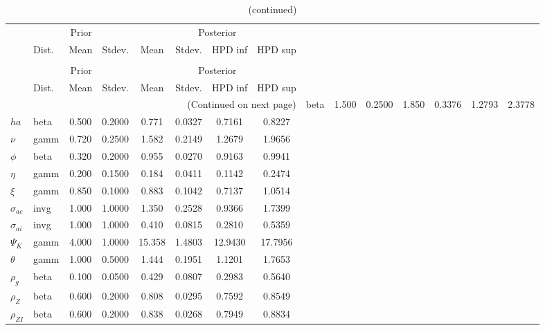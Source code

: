  
\begin{center}
\begin{longtable}{llcccccc} 
\caption{Results from Metropolis-Hastings (parameters)}
 \label{Table:MHPosterior:1}\\
\toprule 
  & \multicolumn{3}{c}{Prior}  &  \multicolumn{4}{c}{Posterior} \\
  \cmidrule(r{.75em}){2-4} \cmidrule(r{.75em}){5-8}
  & Dist. & Mean  & Stdev. & Mean & Stdev. & HPD inf & HPD sup\\
\midrule \endfirsthead 
\caption{(continued)}\\\toprule 
  & \multicolumn{3}{c}{Prior}  &  \multicolumn{4}{c}{Posterior} \\
  \cmidrule(r{.75em}){2-4} \cmidrule(r{.75em}){5-8}
  & Dist. & Mean  & Stdev. & Mean & Stdev. & HPD inf & HPD sup\\
\midrule \endhead 
\bottomrule \multicolumn{8}{r}{(Continued on next page)} \endfoot 
\bottomrule \endlastfoot 
${\sigma}$ & beta &   1.500 & 0.2500 &   1.850& 0.3376 &  1.2793 &  2.3778 \\ 
${ha}$ & beta &   0.500 & 0.2000 &   0.771& 0.0327 &  0.7161 &  0.8227 \\ 
$\nu$ & gamm &   0.720 & 0.2500 &   1.582& 0.2149 &  1.2679 &  1.9656 \\ 
${\phi}$ & beta &   0.320 & 0.2000 &   0.955& 0.0270 &  0.9163 &  0.9941 \\ 
${\eta}$ & gamm &   0.200 & 0.1500 &   0.184& 0.0411 &  0.1142 &  0.2474 \\ 
$\xi$ & gamm &   0.850 & 0.1000 &   0.883& 0.1042 &  0.7137 &  1.0514 \\ 
${\sigma_{ac}}$ & invg &   1.000 & 1.0000 &   1.350& 0.2528 &  0.9366 &  1.7399 \\ 
${\sigma_{ai}}$ & invg &   1.000 & 1.0000 &   0.410& 0.0815 &  0.2810 &  0.5359 \\ 
${\Psi_{K}}$ & gamm &   4.000 & 1.0000 &  15.358& 1.4803 & 12.9430 & 17.7956 \\ 
${\theta}$ & gamm &   1.000 & 0.5000 &   1.444& 0.1951 &  1.1201 &  1.7653 \\ 
${\rho_g}$ & beta &   0.100 & 0.0500 &   0.429& 0.0807 &  0.2983 &  0.5640 \\ 
${\rho_Z}$ & beta &   0.600 & 0.2000 &   0.808& 0.0295 &  0.7592 &  0.8549 \\ 
${\rho_{ZI}}$ & beta &   0.600 & 0.2000 &   0.838& 0.0268 &  0.7949 &  0.8834 \\ 

\end{longtable}
\end{center}
